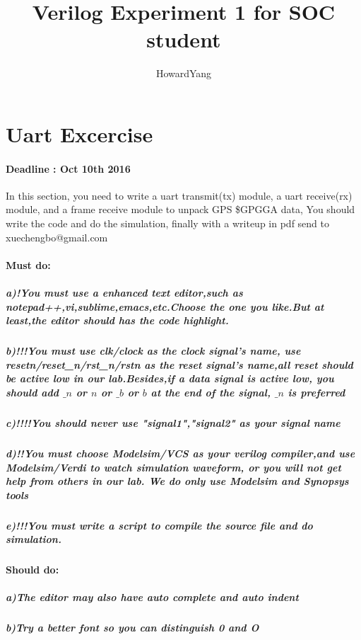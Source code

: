 \documentclass{article}
\author{HowardYang}
\title{Verilog Experiment 1 for SOC student}
\begin{document}
\maketitle
\newpage{}
\section{Uart Excercise}
\paragraph{Deadline : Oct 10th 2016\\}
In this section, you need to write a uart transmit(tx) module, a uart receive(rx) module, and a frame receive module to unpack GPS \$GPGGA data, You should write the code and do the simulation, finally with a writeup in pdf send to xuechengbo@gmail.com
\paragraph{Must do:}
\subparagraph {a)!You must use a enhanced text editor,such as notepad++,vi,sublime,emacs,etc.Choose the one you like.But at least,the editor should has the code highlight.}
\subparagraph {b)!!!You must use clk/clock as the clock signal's name, use resetn/reset\_n/rst\_n/rstn as the reset signal's name,all reset should be active low in our lab.Besides,if a data signal is active low, you should add $\_n$ or $n$ or $\_b$ or $b$ at the end of the signal, $\_n$ is preferred}
\subparagraph {c)!!!!You should never use "signal1","signal2" as your signal name}
\subparagraph {d)!!You must choose Modelsim/VCS as your verilog compiler,and use Modelsim/Verdi to watch simulation waveform, or you will not get help from others in our lab. We do only use Modelsim and Synopsys tools}
\subparagraph {e)!!!You must write a script to compile the source file and do simulation.}
\paragraph{Should do:}
\subparagraph {a)The editor may also have auto complete and auto indent}
\subparagraph {b)Try a better font so you can distinguish 0 and O}
\end{document}

